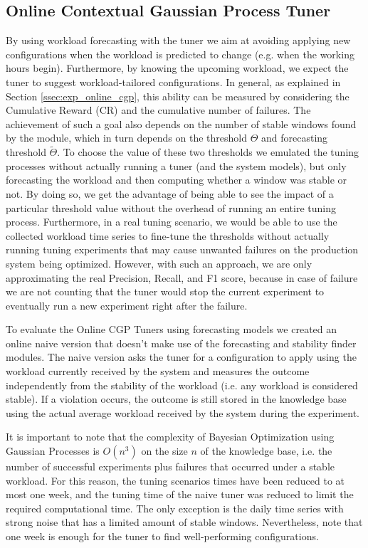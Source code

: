\documentclass[a4paper, 12pt]{article} %
\begin{document}
	
	
	\subsection{Online Contextual Gaussian Process Tuner} \label{ssec:results_online_cgp_tuner}
	By using workload forecasting with the tuner we aim at avoiding applying new configurations when the workload is predicted to change (e.g. when the working hours begin). Furthermore, by knowing the upcoming workload, we expect the tuner to suggest workload-tailored configurations. In general, as explained in Section \ref{ssec:exp_online_cgp}, this ability can be measured by considering the Cumulative Reward (CR) and the cumulative number of failures.
	The achievement of such a goal also depends on the number of stable windows found by the module, which in turn depends on the threshold $\Theta$ and forecasting threshold $\tilde{\Theta}$. To choose the value of these two thresholds we emulated the tuning processes without actually running a tuner (and the system models), but only forecasting the workload and then computing whether a window was stable or not. By doing so, we get the advantage of being able to see the impact of a particular threshold value without the overhead of running an entire tuning process. Furthermore, in a real tuning scenario, we would be able to use the collected workload time series to fine-tune the thresholds without actually running tuning experiments that may cause unwanted failures on the production system being optimized. However, with such an approach, we are only approximating the real Precision, Recall, and F1 score, because in case of failure we are not counting that the tuner would stop the current experiment to eventually run a new experiment right after the failure.
	
	To evaluate the Online CGP Tuners using forecasting models we created an online naive version that doesn't make use of the forecasting and stability finder modules. The naive version asks the tuner for a configuration to apply using the workload currently received by the system and measures the outcome independently from the stability of the workload (i.e. any workload is considered stable). If a violation occurs, the outcome is still stored in the knowledge base using the actual average workload received by the system during the experiment.
	
	It is important to note that the complexity of Bayesian Optimization using Gaussian Processes is $O(n^3)$ on the size $n$ of the knowledge base, i.e. the number of successful experiments plus failures that occurred under a stable workload. For this reason, the tuning scenarios times have been reduced to at most one week, and the tuning time of the naive tuner was reduced to limit the required computational time. The only exception is the daily time series with strong noise that has a limited amount of stable windows. Nevertheless, note that one week is enough for the tuner to find well-performing configurations. 
	
\end{document}
